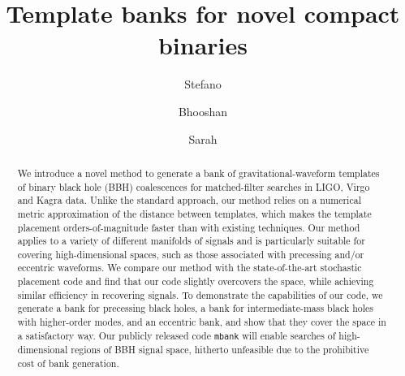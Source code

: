 \documentclass[twocolumn,showpacs,preprintnumbers,nofootinbib,prd,
superscriptaddress,10pt]{revtex4-2}
\newcommand{\stefano}[1]{{\textcolor{blue}{\texttt{SS: #1}} }}
\begin{document}
\begin{abstract}
	We introduce a novel method to generate a bank of gravitational-waveform templates of binary black hole (BBH) coalescences for matched-filter searches in LIGO, Virgo and Kagra data. Unlike the standard approach, our method relies on a numerical metric approximation of the distance between templates, which makes the template placement orders-of-magnitude faster than with existing techniques.
	Our method applies to a variety of different manifolds of signals and is particularly suitable for covering high-dimensional spaces, such as those associated with precessing and/or eccentric waveforms.
	We compare our method with the state-of-the-art stochastic placement code and find that our code slightly overcovers the space, while achieving similar efficiency in recovering signals. To demonstrate the capabilities of our code, we generate a bank for precessing black holes, a bank for intermediate-mass black holes with higher-order modes, and an eccentric bank, and show that they cover the space in a satisfactory way.
	Our publicly released code \texttt{mbank} will enable searches of high-dimensional regions of BBH signal space, hitherto unfeasible due to the prohibitive cost of bank generation.
\end{abstract}
	
 \title{Template banks for novel compact binaries}
	\author{Stefano }

	\author{Bhooshan }
        
	\author{Sarah }
	\maketitle
\end{document}
